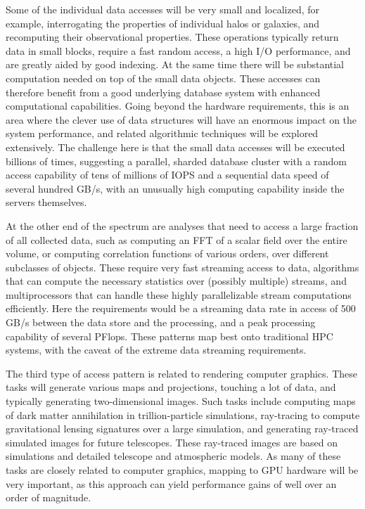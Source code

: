 Some of the individual data accesses will be very small and localized,
for example, interrogating the properties of individual halos or galaxies, and
recomputing their observational properties. These operations typically
return data in small blocks, require a fast random access, a high I/O
performance, and are greatly aided by good indexing. At the same time
there will be substantial computation needed on top of the small data
objects. These accesses can therefore benefit from a good underlying
database system with enhanced computational capabilities. Going beyond
the hardware requirements, this is an area where the clever use of
data structures will have an enormous impact on the system
performance, and related algorithmic techniques will be explored
extensively. The challenge here is that the small data accesses will
be executed billions of times, suggesting a parallel, sharded database
cluster with a random access capability of tens of millions of IOPS
and a sequential data speed of several hundred GB/s, with an unusually
high computing capability inside the servers themselves.

At the other end of the spectrum are analyses that need to access a
large fraction of all collected data, such as computing an FFT of a
scalar field over the entire volume, or computing correlation
functions of various orders, over different subclasses of
objects. These require very fast streaming access to data, algorithms
that can compute the necessary statistics over (possibly multiple)
streams, and multiprocessors that can handle these highly
parallelizable stream computations efficiently. Here the requirements
would be a streaming data rate in access of 500 GB/s between the data
store and the processing, and a peak processing capability of several
PFlops. These patterns map best onto traditional HPC systems, with the
caveat of the extreme data streaming requirements.

The third type of access pattern is related to rendering computer
graphics. These tasks will generate various maps and projections,
touching a lot of data, and typically generating two-dimensional
images. Such tasks include computing maps of dark matter annihilation
in trillion-particle simulations, ray-tracing to compute gravitational
lensing signatures over a large simulation, and generating ray-traced
simulated images for future telescopes. These ray-traced images are
based on simulations and detailed telescope and atmospheric models. As
many of these tasks are closely related to computer graphics, mapping
to GPU hardware will be very important, as this approach can yield
performance gains of well over an order of magnitude.

